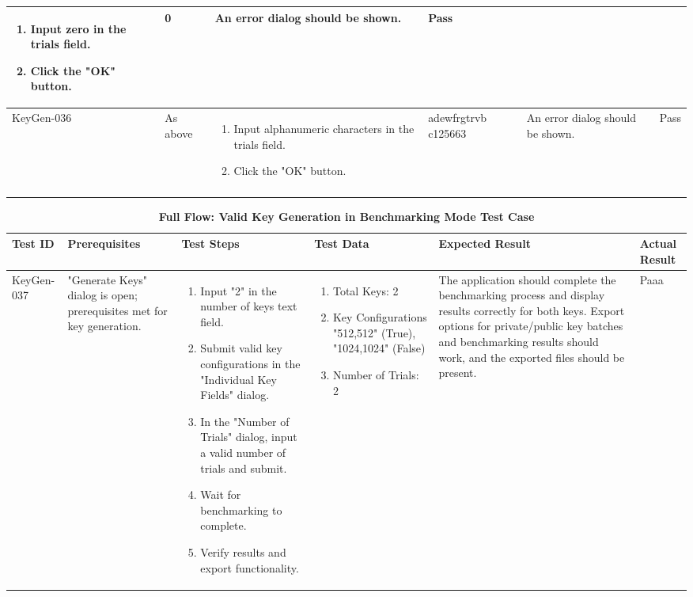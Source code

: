 \documentclass[]{final_report}
\theoremstyle{definition}
\begin{document}
\begin{longtable}{|p{1.5cm}|p{2.5cm}|p{3.5cm}|p{2.5cm}|p{3cm}|p{2cm}|}
  \begin{enumerate}
  \item Input zero in the trials field.
  \item Click the "OK" button.
  \end{enumerate} & 0 & An error dialog should be shown. & Pass \\
  \hline
  KeyGen-036 & As above & 
  \begin{enumerate}
  \item Input alphanumeric characters in the trials field.
  \item Click the "OK" button.
  \end{enumerate} & adewfrgtrvb
  c125663 & An error dialog should be shown. & Pass \\
  \hline
  \label{numTrials}
\end{longtable}



\begin{longtable}{|p{1.5cm}|p{2.5cm}|p{3.5cm}|p{2.5cm}|p{3cm}|p{2cm}|}
  \caption{\textbf{Full Flow: Valid Key Generation in Benchmarking Mode Test Case}} \\
  \hline
  \textbf{Test ID} & \textbf{Prerequisites} & \textbf{Test Steps} & \textbf{Test Data} & \textbf{Expected Result} & \textbf{Actual Result} \\
  \hline
  KeyGen-037 & "Generate Keys" dialog is open; prerequisites met for key generation. & 
  \begin{enumerate}
  \item Input "2" in the number of keys text field.
  \item Submit valid key configurations in the "Individual Key Fields" dialog.
  \item In the "Number of Trials" dialog, input a valid number of trials and submit.
  \item Wait for benchmarking to complete.
  \item Verify results and export functionality.
  \end{enumerate} & 
    \begin{enumerate}
  \item Total Keys: 2 
  \item  Key Configurations
  "512,512" (True), 
  "1024,1024" (False)
  \item Number of Trials: 2
  \end{enumerate} 
    & The application should complete the benchmarking process and display results correctly for both keys. Export options for private/public key batches and benchmarking results should work, and the exported files should be present. & Paaa \\
  \hline
\end{longtable}
\end{document}
